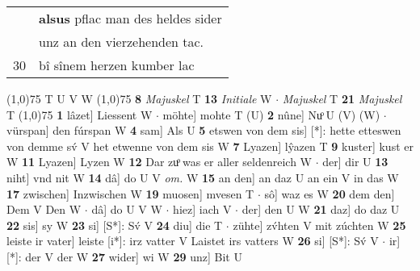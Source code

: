 \documentclass[8pt,a4paper,notitlepage]{article}
\begin{document}
\begin{table}[ht]
\begin{minipage}[t]{0.5\linewidth}
\begin{tabular}{rl}
 & \textbf{alsus} pflac man des heldes sider\\ 
 & unz an den vierzehenden tac.\\ 
30 & bî sînem herzen kumber lac\\ 
\end{tabular}
\scriptsize
\line(1,0){75} \newline
T U V W \newline
\line(1,0){75} \newline
\textbf{8} \textit{Majuskel} T  \textbf{13} \textit{Initiale} W   $\cdot$ \textit{Majuskel} T  \textbf{21} \textit{Majuskel} T  \newline
\line(1,0){75} \newline
\textbf{1} lâzet] Liessent W  $\cdot$ möhte] mohte T (U) \textbf{2} nûne] Nuͦ U (V) (W)  $\cdot$ vürspan] den fúrspan W \textbf{4} sam] Als U \textbf{5} etswen von dem sis] [*]: hette etteswen von demme sv́ V het etwenne von dem sis W \textbf{7} Lyazen] lŷazen T \textbf{9} kuster] kust er W \textbf{11} Lyazen] Lyzen W \textbf{12} Dar zuͦ was er aller seldenreich W  $\cdot$ der] dir U \textbf{13} niht] vnd nit W \textbf{14} dâ] do U V \textit{om.} W \textbf{15} an den] an daz U an ein V in das W \textbf{17} zwischen] Inzwischen W \textbf{19} muosen] mvesen T  $\cdot$ sô] waz es W \textbf{20} dem den] Dem V Den W  $\cdot$ dâ] do U V W  $\cdot$ hiez] iach V  $\cdot$ der] den U W \textbf{21} daz] do daz U \textbf{22} sis] sy W \textbf{23} si] [S*]: Sv́ V \textbf{24} diu] die T  $\cdot$ zühte] zv́hten V mit zúchten W \textbf{25} leiste ir vater] leiste [i*]: irz vatter V Laistet irs vatters W \textbf{26} si] [S*]: Sv́ V  $\cdot$ ir] [*]: der V der W \textbf{27} wider] wi W \textbf{29} unz] Bit U \newline
\end{minipage}
\end{table}
\end{document}
